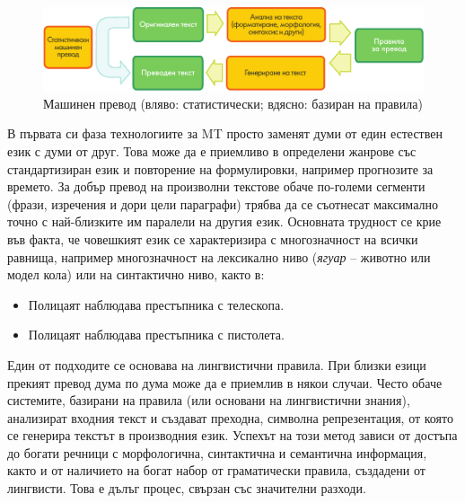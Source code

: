 \begin{multicols}{2}
  \begin{figure}[htb]
    \center
    \includegraphics[width=\textwidth]{../_media/bulgarian/machine_translation}
    \vspace{-2mm}
    \caption{Машинен превод (вляво: статистически; вдясно: базиран на правила)}
    \label{fig:mtarch_de}
  \end{figure}

  В първата си фаза технологиите за MT просто заменят думи от един естествен език с думи от друг. Това може да
   е приемливо в определени жанрове със стандартизиран език и повторение на формулировки, например прогнозите за времето.
   За добър превод на произволни текстове обаче
   по-големи  сегменти (фрази, изречения и дори цели параграфи) трябва да се съотнесат максимално точно с най-близките им паралели на другия
   език. Основната трудност се крие във факта, че
   човешкият език се характеризира с многозначност на 
  всички равнища,
   например
   многозначност на лексикално ниво ({\it ягуар} – животно
   или модел кола) или на
   синтактично ниво, както в:

  \begin{itemize}
  \item Полицаят наблюдава престъпника с телескопа.
  \item Полицаят наблюдава престъпника с пистолета.
  \end{itemize}

  Един от подходите се основава на лингвистични правила.
   При близки езици прекият превод дума по дума може да е приемлив в някои случаи. Често обаче системите,
   базирани на правила (или основани на лингвистични знания),
   анализират входния текст и създават преходна, символна
   репрезентация, от която се генерира текстът в
   производния език. Успехът на този метод зависи от
   достъпа до богати речници с морфологична, синтактична
   и семантична информация, както и от наличието на
   богат набор от граматически правила, създадени от лингвисти.
   Това е дълъг процес, свързан със значителни разходи.


\end{multicols}
